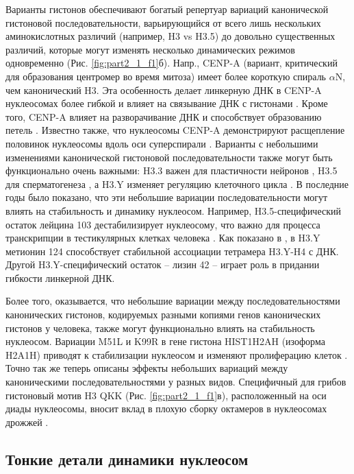     Варианты гистонов обеспечивают богатый репертуар вариаций канонической гистоновой последовательности, варьирующийся от всего лишь нескольких аминокислотных различий (например, H3 vs H3.5) до довольно существенных различий, которые могут изменять несколько динамических режимов одновременно (Рис. \ref{fig:part2_1_f1}б). Напр., CENP-A (вариант, критический для образования центромер во время митоза) имеет более короткую спираль $\alpha$N, чем канонический H3. Эта особенность делает линкерную ДНК в CENP-A нуклеосомах более гибкой и влияет на связывание ДНК с гистонами \cite{roulland_flexible_2016}. Кроме того, CENP-A влияет на разворачивание ДНК и способствует образованию петель \cite{stumme-diers_nanoscale_2018}. Известно также, что нуклеосомы CENP-A демонстрируют расщепление половинок нуклеосомы вдоль оси суперспирали \cite{falk_cenp-c_2015}. Варианты с небольшими изменениями канонической гистоновой последовательности также могут быть функционально очень важными: H3.3 важен для пластичности нейронов \cite{maze_critical_2015}, H3.5 для сперматогенеза \cite{urahama_histone_2016}, а H3.Y изменяет регуляцию клеточного цикла \cite{wiedemann_identification_2010}. В последние годы было показано, что эти небольшие вариации последовательности могут влиять на стабильность и динамику нуклеосом. Например, H3.5-специфический остаток лейцина 103 дестабилизирует нуклеосому, что важно для процесса транскрипции в тестикулярных клетках человека \cite{urahama_histone_2016}. Как показано в \cite{kujirai_identification_2017}, в H3.Y метионин 124 способствует стабильной ассоциации тетрамера H3.Y-H4 с ДНК. Другой H3.Y-специфический остаток -- лизин 42 -- играет роль в придании гибкости линкерной ДНК. 
    
    Более того, оказывается, что небольшие вариации между последовательностями канонических гистонов, кодируемых разными копиями генов канонических гистонов у человека, также могут функционально влиять на стабильность нуклеосом. Вариации M51L и K99R в гене гистона HIST1H2AH (изоформа H2A1H) приводят к стабилизации нуклеосом и изменяют пролиферацию клеток \cite{bhattacharya_histone_2017}. Точно так же теперь описаны эффекты небольших вариаций между каноническими последовательностями у разных видов. Специфичный для грибов гистоновый мотив H3 QKK (Рис. \ref{fig:part2_1_f1}в), расположенный на оси диады нуклеосомы, вносит вклад в плохую сборку октамеров в нуклеосомах дрожжей \cite{leung_unique_2016}.


\subsection{Тонкие детали динамики нуклеосом}

